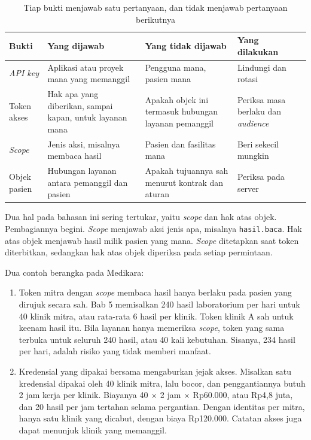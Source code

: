 \begin{table}[!htb]
  \centering
  \caption{Tiap bukti menjawab satu pertanyaan, dan tidak menjawab pertanyaan berikutnya}
  \label{tab:ch06-bukti}
  \small
  \begin{tabularx}{\textwidth}{T{1.7cm}QQT{2.3cm}}
    \hline
    \textbf{Bukti} & \textbf{Yang dijawab} & \textbf{Yang tidak dijawab} & \textbf{Yang dilakukan} \\ \hline
    \textit{API key} & Aplikasi atau proyek mana yang memanggil & Pengguna mana, pasien mana & Lindungi dan rotasi \\ \hline
    Token akses & Hak apa yang diberikan, sampai kapan, untuk layanan mana & Apakah objek ini termasuk hubungan layanan pemanggil & Periksa masa berlaku dan \textit{audience} \\ \hline
    \textit{Scope} & Jenis aksi, misalnya membaca hasil & Pasien dan fasilitas mana & Beri sekecil mungkin \\ \hline
    Objek pasien & Hubungan layanan antara pemanggil dan pasien & Apakah tujuannya sah menurut kontrak dan aturan & Periksa pada server \\ \hline
  \end{tabularx}
\end{table}

Dua hal pada bahasan ini sering tertukar, yaitu \textit{scope} dan hak atas objek. Pembagiannya begini. \textit{Scope}
menjawab aksi jenis apa, misalnya \texttt{hasil.baca}. Hak atas objek menjawab hasil milik pasien yang mana.
\textit{Scope} ditetapkan saat token diterbitkan, sedangkan hak atas objek diperiksa pada setiap permintaan.

Dua contoh berangka pada Medikara:
\begin{enumerate}
  \item Token mitra dengan \textit{scope} membaca hasil hanya berlaku pada pasien yang dirujuk secara sah. Bab 5
        memisalkan 240 hasil laboratorium per hari untuk 40 klinik mitra, atau rata-rata 6 hasil per klinik. Token
        klinik A sah untuk keenam hasil itu. Bila layanan hanya memeriksa \textit{scope}, token yang sama terbuka untuk
        seluruh 240 hasil, atau 40 kali kebutuhan. Sisanya, 234 hasil per hari, adalah risiko yang tidak memberi
        manfaat.
  \item Kredensial yang dipakai bersama mengaburkan jejak akses. Misalkan satu kredensial dipakai oleh 40 klinik mitra,
        lalu bocor, dan penggantiannya butuh 2 jam kerja per klinik. Biayanya 40 $\times$ 2 jam $\times$ Rp60.000, atau
        Rp4,8 juta, dan 20 hasil per jam tertahan selama pergantian. Dengan identitas per mitra, hanya satu klinik yang
        dicabut, dengan biaya Rp120.000. Catatan akses juga dapat menunjuk klinik yang memanggil.
\end{enumerate}

